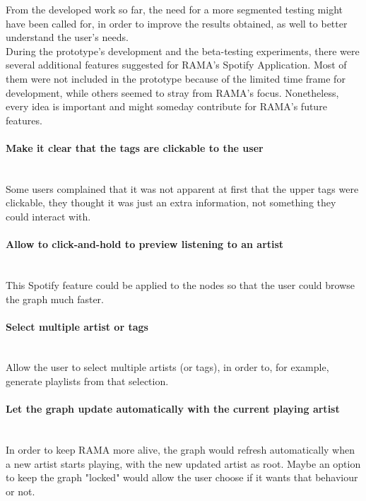   From the developed work so far, the need for a more segmented testing might have been called for, in order to improve the results obtained, as well to better understand the user's needs. \\

  During the prototype's development and the beta-testing experiments, there were several additional features suggested for RAMA's Spotify Application.
  Most of them were not included in the prototype because of the limited time frame for development, while others seemed to stray from RAMA's focus.
  Nonetheless, every idea is important and might someday contribute for RAMA's future features.

  \paragraph*{Make it clear that the tags are clickable to the user} \hfill \\
  \indent Some users complained that it was not apparent at first that the upper tags were clickable, they thought it was just an extra information, not something they could interact with.

  \paragraph*{Allow to click-and-hold to preview listening to an artist} \hfill \\
  \indent This Spotify feature could be applied to the nodes so that the user could browse the graph much faster. \\

  \paragraph*{Select multiple artist or tags} \hfill \\
  \indent Allow the user to select multiple artists (or tags), in order to, for example, generate playlists from that selection.

  \paragraph*{Let the graph update automatically with the current playing artist} \hfill \\
  \indent In order to keep RAMA more alive, the graph would refresh automatically when a new artist starts playing, with the new updated artist as root.
  Maybe an option to keep the graph "locked" would allow the user choose if it wants that behaviour or not.

